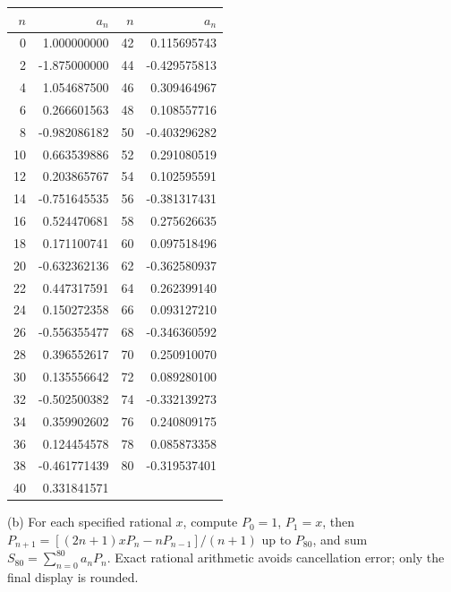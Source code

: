 \begin{center}\small\begin{tabular}{r r|r r}\toprule
$n$&$a_n$&$n$&$a_n$\\\midrule
0&1.000000000&42&0.115695743\\
2&-1.875000000&44&-0.429575813\\
4&1.054687500&46&0.309464967\\
6&0.266601563&48&0.108557716\\
8&-0.982086182&50&-0.403296282\\
10&0.663539886&52&0.291080519\\
12&0.203865767&54&0.102595591\\
14&-0.751645535&56&-0.381317431\\
16&0.524470681&58&0.275626635\\
18&0.171100741&60&0.097518496\\
20&-0.632362136&62&-0.362580937\\
22&0.447317591&64&0.262399140\\
24&0.150272358&66&0.093127210\\
26&-0.556355477&68&-0.346360592\\
28&0.396552617&70&0.250910070\\
30&0.135556642&72&0.089280100\\
32&-0.502500382&74&-0.332139273\\
34&0.359902602&76&0.240809175\\
36&0.124454578&78&0.085873358\\
38&-0.461771439&80&-0.319537401\\
40&0.331841571&&\\
\bottomrule\end{tabular}\end{center}
(b) For each specified rational $x$, compute $P_0=1$, $P_1=x$,
then $P_{n+1}=[(2n+1)xP_n-nP_{n-1}]/(n+1)$ up to $P_{80}$,
and sum $S_{80}=\sum_{n=0}^{80}a_nP_n$. Exact rational arithmetic avoids
cancellation error; only the final display is rounded.

